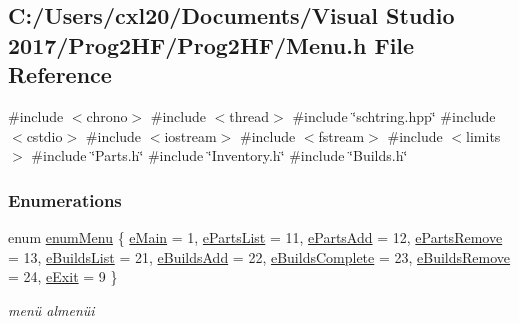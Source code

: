 \subsection{C\+:/\+Users/cxl20/\+Documents/\+Visual Studio 2017/\+Prog2\+H\+F/\+Prog2\+H\+F/\+Menu.h File Reference}
\label{_menu_8h}
{\ttfamily \#include $<$chrono$>$}\newline
{\ttfamily \#include $<$thread$>$}\newline
{\ttfamily \#include \char`\"{}schtring.\+hpp\char`\"{}}\newline
{\ttfamily \#include $<$cstdio$>$}\newline
{\ttfamily \#include $<$iostream$>$}\newline
{\ttfamily \#include $<$fstream$>$}\newline
{\ttfamily \#include $<$limits$>$}\newline
{\ttfamily \#include \char`\"{}Parts.\+h\char`\"{}}\newline
{\ttfamily \#include \char`\"{}Inventory.\+h\char`\"{}}\newline
{\ttfamily \#include \char`\"{}Builds.\+h\char`\"{}}\newline
\subsubsection*{Enumerations}
\begin{DoxyCompactItemize}
\item 
enum \mbox{\hyperlink{_menu_8h_adbc27074b7dcd54cd4578936c6329d02}{enum\+Menu}} \{ \newline
\mbox{\hyperlink{_menu_8h_adbc27074b7dcd54cd4578936c6329d02a51060f19a5d0006e2cb20df8786a330b}{e\+Main}} = 1, 
\mbox{\hyperlink{_menu_8h_adbc27074b7dcd54cd4578936c6329d02a8d35c4ba2bd3370a44513dbdbdbd0ff6}{e\+Parts\+List}} = 11, 
\mbox{\hyperlink{_menu_8h_adbc27074b7dcd54cd4578936c6329d02a1fedbd15c99125bee9cb78cffbf7228b}{e\+Parts\+Add}} = 12, 
\mbox{\hyperlink{_menu_8h_adbc27074b7dcd54cd4578936c6329d02af19f793fac63215e67f31045c7371d1c}{e\+Parts\+Remove}} = 13, 
\newline
\mbox{\hyperlink{_menu_8h_adbc27074b7dcd54cd4578936c6329d02a34f49f61c9b4bdb2fe1be11758138084}{e\+Builds\+List}} = 21, 
\mbox{\hyperlink{_menu_8h_adbc27074b7dcd54cd4578936c6329d02a18af4c5278fb8ad13d84f598c68e766e}{e\+Builds\+Add}} = 22, 
\mbox{\hyperlink{_menu_8h_adbc27074b7dcd54cd4578936c6329d02af613ab36150110e3914604d4e4de2e06}{e\+Builds\+Complete}} = 23, 
\mbox{\hyperlink{_menu_8h_adbc27074b7dcd54cd4578936c6329d02a0de8366351ca70766ec80390d94387a8}{e\+Builds\+Remove}} = 24, 
\newline
\mbox{\hyperlink{_menu_8h_adbc27074b7dcd54cd4578936c6329d02af2f1713ca51324f5000bf36d36bfd684}{e\+Exit}} = 9
 \}
\begin{DoxyCompactList}\small\item\em menü almenüi \end{DoxyCompactList}\end{DoxyCompactItemize}
